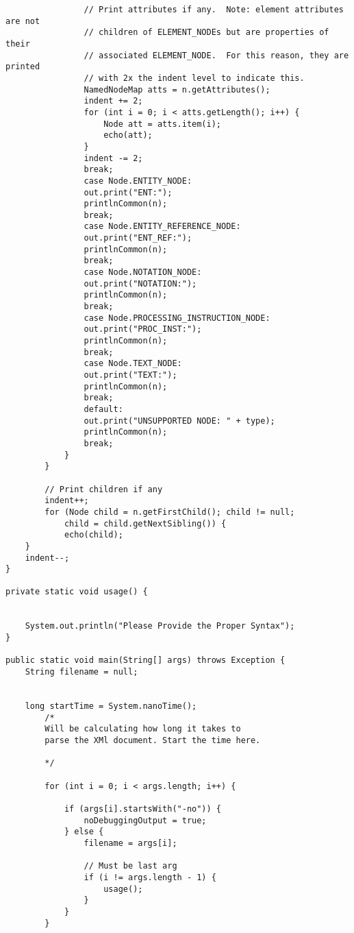 \documentclass[11pt,english]{article}
\begin{document}
\begin{lstlisting}
                // Print attributes if any.  Note: element attributes are not
                // children of ELEMENT_NODEs but are properties of their
                // associated ELEMENT_NODE.  For this reason, they are printed
                // with 2x the indent level to indicate this.
                NamedNodeMap atts = n.getAttributes();
                indent += 2;
                for (int i = 0; i < atts.getLength(); i++) {
                    Node att = atts.item(i);
                    echo(att);
                }
                indent -= 2;
                break;
                case Node.ENTITY_NODE:
                out.print("ENT:");
                printlnCommon(n);
                break;
                case Node.ENTITY_REFERENCE_NODE:
                out.print("ENT_REF:");
                printlnCommon(n);
                break;
                case Node.NOTATION_NODE:
                out.print("NOTATION:");
                printlnCommon(n);
                break;
                case Node.PROCESSING_INSTRUCTION_NODE:
                out.print("PROC_INST:");
                printlnCommon(n);
                break;
                case Node.TEXT_NODE:
                out.print("TEXT:");
                printlnCommon(n);
                break;
                default:
                out.print("UNSUPPORTED NODE: " + type);
                printlnCommon(n);
                break;
            }
        }

        // Print children if any
        indent++;
        for (Node child = n.getFirstChild(); child != null;
            child = child.getNextSibling()) {
            echo(child);
    }
    indent--;
}

private static void usage() {


    System.out.println("Please Provide the Proper Syntax");
}

public static void main(String[] args) throws Exception {
    String filename = null;
    

    long startTime = System.nanoTime();
        /*
        Will be calculating how long it takes to
        parse the XMl document. Start the time here.

        */

        for (int i = 0; i < args.length; i++) {
        	
            if (args[i].startsWith("-no")) {
                noDebuggingOutput = true;
            } else {
                filename = args[i];

                // Must be last arg
                if (i != args.length - 1) {
                    usage();
                }
            }
        }


\end{lstlisting}
\end{document}

